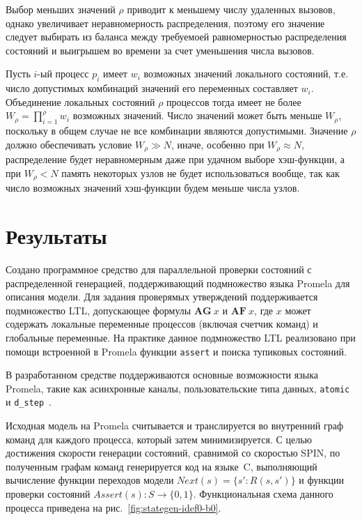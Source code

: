 \documentclass[12pt,a4paper,fleqn]{article}
\begin{document}
Выбор меньших значений $\rho$ приводит к меньшему числу удаленных вызовов, однако увеличивает неравномерность
распределения, поэтому его значение следует выбирать из баланса между требуемоей равномерностью распределения состояний
и выигрышем во времени за счет уменьшения числа вызовов.

Пусть $i$-ый процесс $p_i$ имеет $w_i$ возможных значений локального состояний, т.е. число допустимых комбинаций
значений его переменных составляет $w_i$. Объединение локальных состояний $\rho$ процессов тогда имеет не более $W_\rho
= \prod_{i=1}^{\rho}{w_i}$ возможных значений. Число значений может быть меньше $W_\rho$, поскольку в общем случае не
все комбинации являются допустимыми. Значение $\rho$ должно обеспечивать условие $W_\rho \gg N$, иначе, особенно при
$W_\rho \approx N$, распределение будет неравномерным даже при удачном выборе хэш-функции, а при $W_\rho < N$ память
некоторых узлов не будет использоваться вообще, так как число возможных значений хэш-функции будем меньше числа узлов.

\section{Результаты}
\label{sec:experim}

Создано программное средство для параллельной проверки состояний с распределенной генерацией, поддерживающий
подмножество языка Promela для описания модели. Для задания проверямых утверждений поддерживается подмножество LTL,
допускающее формулы $\mathbf{AG}~x$ и $\mathbf{AF}~x$, где $x$ может содержать локальные переменные процессов (включая
счетчик команд) и глобальные переменные. На практике данное подмножество LTL реализовано при помощи встроенной в Promela
функции \texttt{assert} и поиска тупиковых состояний.

В разработанном средстве поддерживаются основные возможности языка Promela, такие как асинхронные каналы,
пользовательские типа данных, \texttt{atomic} и \texttt{d\_step}~\cite{SpinRoot}.

Исходная модель на Promela считывается и транслируется во внутренний граф команд для каждого процесса, который затем
минимизируется. С целью достижения скорости генерации состояний, сравнимой со скоростью SPIN, по полученным графам
команд генерируется код на языке~C, выполняющий вычисление функции переходов модели $Next(s) = \{s': R(s, s')\}$ и
функции проверки состояний $Assert(s): S \rightarrow \{0, 1\}$. Функциональная схема данного процесса приведена на
рис.~\ref{fig:stategen-idef0-b0}.
\end{document}
